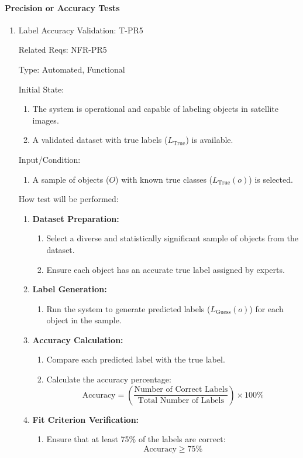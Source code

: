 \documentclass[12pt, titlepage]{article}
\begin{document}
\paragraph{Precision or Accuracy Tests}
\begin{enumerate}

\item{Label Accuracy Validation: T-PR5\\}

Related Reqs: NFR-PR5

Type: Automated, Functional

Initial State:
\begin{enumerate}
    \item The system is operational and capable of labeling objects in satellite images.
    \item A validated dataset with true labels ($L_{\text{True}}$) is available.
\end{enumerate}
Input/Condition:
\begin{enumerate}
    \item A sample of objects ($O$) with known true classes ($L_{\text{True}}(o)$) is selected.
\end{enumerate}
How test will be performed:
\begin{enumerate}
    \item \textbf{Dataset Preparation:}
    \begin{enumerate}
        \item Select a diverse and statistically significant sample of objects from the dataset.
        \item Ensure each object has an accurate true label assigned by experts.
    \end{enumerate}
    
    \item \textbf{Label Generation:}
    \begin{enumerate}
        \item Run the system to generate predicted labels ($L_{\text{Guess}}(o)$) for each object in the sample.
    \end{enumerate}
    
    \item \textbf{Accuracy Calculation:}
    \begin{enumerate}
        \item Compare each predicted label with the true label.
        \item Calculate the accuracy percentage:
        \[
        \text{Accuracy} = \left( \frac{\text{Number of Correct Labels}}{\text{Total Number of Labels}} \right) \times 100\%
        \]
    \end{enumerate}
    
    \item \textbf{Fit Criterion Verification:}
    \begin{enumerate}
        \item Ensure that at least 75\% of the labels are correct:
        \[
        \text{Accuracy} \geq 75\%
        \]
    \end{enumerate}
\end{enumerate}


\end{enumerate}
\end{document}
